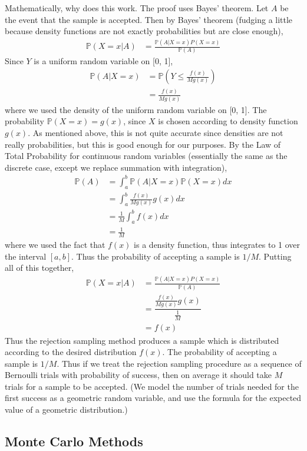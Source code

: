 \documentclass[12pt]{article}
\theoremstyle{definition}
\theoremstyle{remark}
\def\P{{\mathbb P}}
\begin{document}
Mathematically, why does this work. The proof uses Bayes' theorem. Let $A$ be the event that the sample is accepted. Then by Bayes' theorem (fudging a little because density functions are not exactly probabilities but are close enough),
\begin{align*}
\P(X = x | A ) &= \frac{ \P(A | X = x) P(X = x)} {\P(A)}
\end{align*}
Since $Y$ is a uniform random variable on [0, 1],
\begin{align*}
\P(A | X = x ) &= \P \left( Y \leq \frac{ f(x) }{ M g(x) } \right) \\
&= \frac{ f(x) }{ M g(x) }
\end{align*}
where we used the density of the uniform random variable on [0, 1]. The probability $\P(X = x) = g(x)$, since $X$ is chosen according to density function $g(x)$. As mentioned above, this is not quite accurate since densities are not really probabilities, but this is good enough for our purposes. By the Law of Total Probability for continuous random variables (essentially the same as the discrete case, except we replace summation with integration),
\begin{align*}
\P(A) &= \int_a^b \P(A | X = x)\P(X = x) dx \\
&= \int_a^b \frac{f(x)}{ M g(x) } g(x) dx \\
&= \frac{1}{M} \int_a^b f(x) dx \\
&= \frac{1}{M}
\end{align*}
where we used the fact that $f(x)$ is a density function, thus integrates to 1 over the interval $[a, b]$. Thus the probability of accepting a sample is $1/M$. Putting all of this together,
\begin{align*}
\P(X = x | A ) &= \frac{ \P(A | X = x) P(X = x)} {\P(A)} \\
&= \dfrac{ \frac{f(x)}{ M g(x) } g(x) }{ \frac{1}{M} } \\
&= f(x)
\end{align*}
Thus the rejection sampling method produces a sample which is distributed according to the desired distribution $f(x)$. The probability of accepting a sample is $1 / M$. Thus if we treat the rejection sampling procedure as a sequence of Bernoulli trials with probability of success, then on average it should take $M$ trials for a sample to be accepted. (We model the number of trials needed for the first success as a geometric random variable, and use the formula for the expected value of a geometric distribution.)

\subsection{Monte Carlo Methods}
\end{document}
